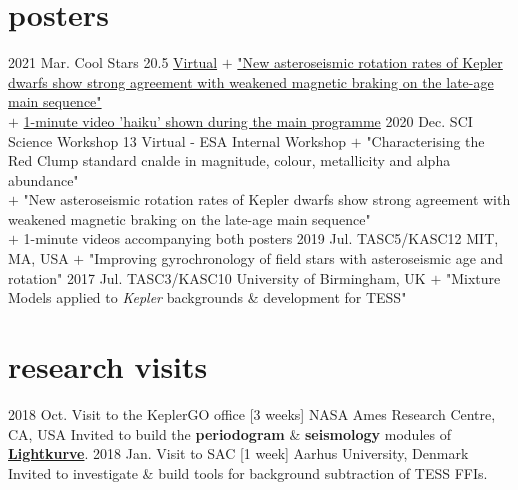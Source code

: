 \documentclass[letterpaper]{k-cv} %
\begin{document}
\section{\color{c1}posters}

\begin{entrylist}
	\centry
	{2021 Mar.}
	{Cool Stars 20.5}
	{\href{http://coolstars20.cfa.harvard.edu/cs20half/program.html}{Virtual}}
	{$+$ \small{\href{https://zenodo.org/record/4562478}{"New asteroseismic rotation rates of Kepler dwarfs show strong agreement with weakened magnetic braking on the late-age main sequence"}}\\
		$+$ \small{\href{https://zenodo.org/record/4562487}{1-minute video 'haiku' shown during the main programme}}}
	\centry
	{2020 Dec.}
	{SCI Science Workshop 13}
	{Virtual - ESA Internal Workshop}
	{$+$ \small{"Characterising the Red Clump standard cnalde in magnitude, colour, metallicity and alpha abundance"}\\
		$+$ \small{"New asteroseismic rotation rates of Kepler dwarfs show strong agreement with weakened magnetic braking on the late-age main sequence"}\\
		$+$ \small{1-minute videos accompanying both posters}}
	\centry
	{2019 Jul.}
	{TASC5/KASC12}
	{MIT, MA, USA}
	{$+$ \small{"Improving gyrochronology of field stars with asteroseismic age and rotation"}}
	\centry
	{2017 Jul.}
	{TASC3/KASC10}
	{University of Birmingham, UK}
	{$+$ \small{"Mixture Models applied to \emph{Kepler} backgrounds \& development for TESS"}}
	
\end{entrylist}

\section{\color{c1}research visits}
\begin{entrylist}
	\entry
	{2018 Oct.}
	{Visit to the KeplerGO office [3 weeks]}
	{NASA Ames Research Centre, CA, USA}
	{Invited to build the \textbf{\textcolor{c1}{periodogram}} \&  \textbf{\textcolor{c1}{seismology}} modules of \textbf{\textcolor{c1}{\href{http://docs.lightkurve.org/}{Lightkurve}}}.}
	\entry
	{2018 Jan.}
	{Visit to SAC [1 week]}
	{Aarhus University, Denmark}
	{Invited to investigate \& build tools for background subtraction of TESS FFIs.}
\end{entrylist}
\end{document}
